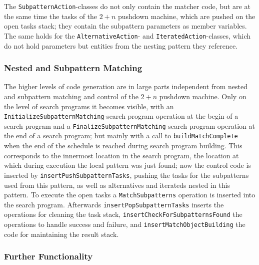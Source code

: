 The \texttt{Subpattern\-Action}-classes do not only contain the matcher code, 
but are at the same time the tasks of the $2+n$ pushdown machine, which are pushed on the open tasks stack;
they contain the subpattern parameters as member variables.
The same holds for the \texttt{Alternative\-Action}- and \texttt{Iterated\-Action}-classes,
which do not hold parameters but entities from the nesting pattern they reference. 


\subsubsection*{Nested and Subpattern Matching}

The higher levels of code generation are in large parts independent from nested and subpattern matching and control of the $2+n$ pushdown machine.
Only on the level of search programs it becomes visible,  
with an \texttt{Initialize\-Subpattern\-Matching}-search program operation at the begin of a search program
and a \texttt{Finalize\-Subpattern\-Matching}-search program operation at the end of a search program;
but mainly with a call to \texttt{build\-Match\-Complete} when the end of the schedule is reached during search program building.
This corresponds to the innermost location in the search program,
the location at which during execution the local pattern was just found;
now the control code is inserted by \texttt{insert\-Push\-Subpattern\-Tasks},
pushing the tasks for the subpatterns used from this pattern, as well as alternatives and iterateds nested in this pattern.
To execute the open tasks a \texttt{Match\-Subpatterns} operation is inserted into the search program. 
Afterwards \texttt{insert\-Pop\-Subpattern\-Tasks} inserts the operations for cleaning the task stack,
\texttt{insert\-Check\-For\-Subpatterns\-Found} the operations to handle success and failure, 
and \texttt{insert\-Match\-Object\-Building} the code for maintaining the result stack.


\subsubsection*{Further Functionality}


